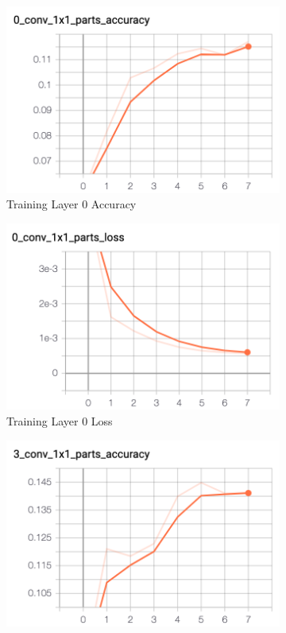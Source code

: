 \documentclass[11pt, letterpaper]{article}
\begin{document}
\begin{figure}[h]
    \centering
    \begin{subfigure}{0.4\textwidth}
        \centering
        \includegraphics[width=0.8\linewidth]{train_layer_0_acc.png}
        \caption{Training Layer 0 Accuracy}
    \end{subfigure}
    \begin{subfigure}{0.4\textwidth}
        \centering
        \includegraphics[width=0.8\linewidth]{train_layer_0_loss.png}
        \caption{Training Layer 0 Loss}
    \end{subfigure}
    \begin{subfigure}{0.4\textwidth}
        \centering
        \includegraphics[width=0.8\linewidth]{train_layer_3_acc.png}

\end{subfigure}
\end{figure}
\end{document}
